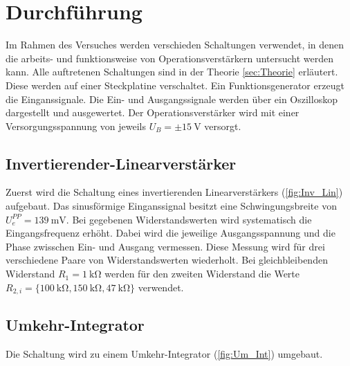 \section{Durchführung}
\label{sec:Durchführung}

Im Rahmen des Versuches werden verschieden Schaltungen verwendet, in denen die arbeits- und funktionsweise von Operationsverstärkern untersucht werden kann.
Alle auftretenen Schaltungen sind in der Theorie \ref{sec:Theorie} erläutert.
Diese werden auf einer Steckplatine verschaltet.
Ein Funktionsgenerator erzeugt die Einganssignale.
Die Ein- und Ausgangssignale werden über ein Oszilloskop dargestellt und ausgewertet. 
Der Operationsverstärker wird mit einer Versorgungsspannung von jeweils $U_B=\pm\SI{15}{\volt}$ versorgt.




\subsection{Invertierender-Linearverstärker}
Zuerst wird die Schaltung eines invertierenden Linearverstärkers (\ref{fig:Inv_Lin}) aufgebaut. 
Das sinusförmige Einganssignal besitzt eine Schwingungsbreite von $U_e^{PP}=\SI{139}{\milli\volt}$.
Bei gegebenen Widerstandswerten wird systematisch die Eingangsfrequenz erhöht.
Dabei wird die jeweilige Ausgangsspannung und die Phase zwisschen Ein- und Ausgang vermessen.
Diese Messung wird für drei verschiedene Paare von Widerstandswerten wiederholt.
Bei gleichbleibenden Widerstand $R_1=\SI{1}{\kilo\ohm}$ werden für den zweiten Widerstand die Werte $R_{2,i}=\{\SI{100}{\kilo\ohm},\SI{150}{\kilo\ohm},\SI{47}{\kilo\ohm}\}$ verwendet.

\subsection{Umkehr-Integrator}

Die Schaltung wird zu einem Umkehr-Integrator (\ref{fig:Um_Int}) umgebaut. 



